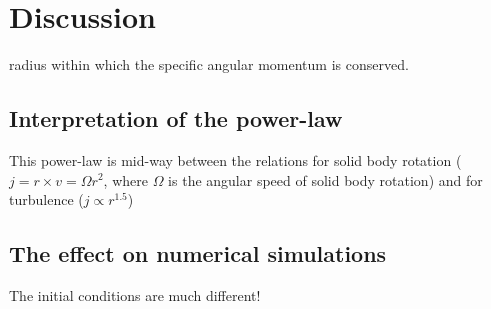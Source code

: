 \section{Discussion}


radius within which the specific angular momentum is conserved. 

\subsection{Interpretation of the power-law}
This power-law is mid-way between the relations for solid body rotation ($j=r\times v=\Omega r^2$, where $\Omega$ is the angular speed of solid body rotation) and for turbulence ($j\propto r^{1.5}$)
  
 \subsection{The effect on numerical simulations}
 The initial conditions are much different!
 
